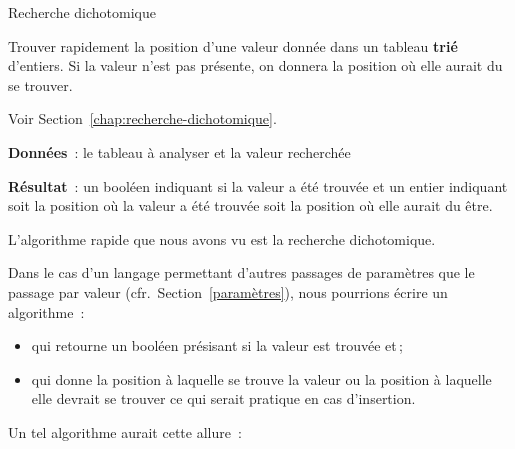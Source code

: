 \begin{Fiche}{Recherche dichotomique}
\label{fiche:dicho}


	Trouver rapidement la position d’une valeur donnée dans un tableau
	\textbf{trié} d’entiers.  Si la valeur n’est pas présente, on donnera la
	position où elle aurait du se trouver.

	Voir Section~\vref{chap:recherche-dichotomique}.

	
	\textbf{Données}~: le tableau à analyser et la valeur recherchée
		
	\textbf{Résultat}~: un booléen indiquant si la valeur a été trouvée et un
	entier indiquant soit la position où la valeur a été trouvée soit la
	position où elle aurait du être.


		L’algorithme rapide que nous avons vu est la recherche
		dichotomique.


		\clearpage
		Dans le cas d'un langage permettant d'autres passages de paramètres que
		le passage par valeur (cfr.~Section~\vref{paramètres}), nous pourrions
		écrire un algorithme~:

		\begin{itemize}
			
			\item qui retourne un booléen présisant si la valeur est trouvée
				et\,;

			\item qui donne la position à laquelle se trouve la valeur ou la
				position à laquelle elle devrait se trouver ce qui serait
				pratique en cas d'insertion. 

		\end{itemize}

		Un tel algorithme aurait cette allure~:
	

\end{Fiche}
